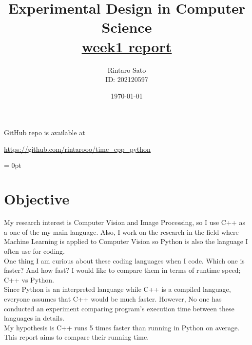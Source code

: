 \documentclass[11pt, a4paper]{article}
\title{Experimental Design in Computer Science \\ \href{https://manaba.tsukuba.ac.jp/ct/course_1910418_report_1960312}{\underline{week1 report}}}
\author{Rintaro Sato \\ ID: 202120597}
\date{\today}
\begin{document}
\maketitle


\centerline{GitHub repo is available at}
\centerline{\underline{\url{https://github.com/rintarooo/time_cpp_python}}}

\noindent
\parindent = 0pt
\section{Objective}
My research interest is Computer Vision and Image Processing, so I use C++ as a one of the my main language. Also, I work on the research in the field where Machine Learning is applied to Computer Vision so Python is also the language I often use for coding.\\

One thing I am curious about these coding languages when I code. Which one is faster? And how fast? I would like to compare them in terms of runtime speed; C++ vs Python.\\

Since Python is an interpreted language while C++ is a compiled language, everyone assumes that C++ would be much faster. However, No one has conducted an experiment comparing program's execution time between these languages in details.\\

My hypothesis is C++ runs 5 times faster than running in Python on average. This report aims to compare their running time.

\end{document}
